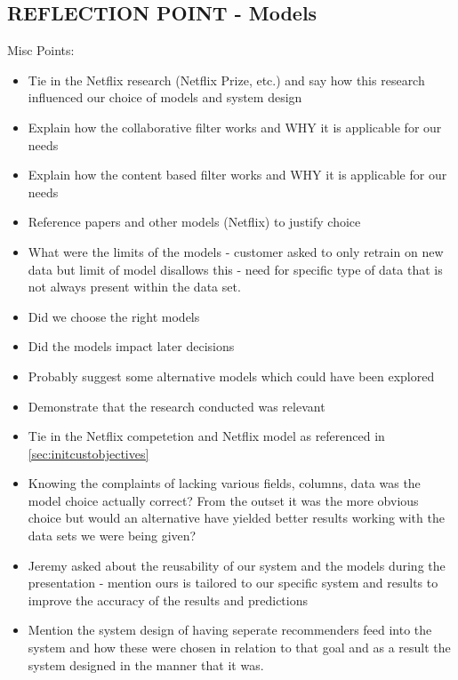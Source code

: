 \documentclass{l3proj}
\begin{document}
\subsection{REFLECTION POINT - Models}
\label{sec:modelreflection}

Misc Points:
\begin{itemize}
\item Tie in the Netflix research (Netflix Prize, etc.) and say how this research influenced our choice of models and system design
\item Explain how the collaborative filter works and WHY it is applicable for our needs
\item Explain how the content based filter works and WHY it is applicable for our needs
\item Reference papers and other models (Netflix) to justify choice
\item What were the limits of the models - customer asked to only retrain on new data but limit of model disallows this - need for specific type of data that is not always present within the data set.
\item Did we choose the right models
\item Did the models impact later decisions
\item Probably suggest some alternative models which could have been explored
\item Demonstrate that the research conducted was relevant
\item Tie in the Netflix competetion and Netflix model as referenced in \ref{sec:initcustobjectives}
\item Knowing the complaints of lacking various fields, columns, data was the model choice actually correct? From the outset it was the more obvious choice but would an alternative have yielded better results working with the data sets we were being given?
\item Jeremy asked about the reusability of our system and the models during the presentation - mention ours is tailored to our specific system and results to improve the accuracy of the results and predictions
\item Mention the system design of having seperate recommenders feed into the system and how these were chosen in relation to that goal and as a result the system designed in the manner that it was.
\end{itemize}
\end{document}
